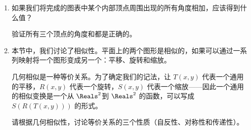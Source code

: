 \begin{enumerate}
    \item 
    如果我们将完成的图表中某个内部顶点周围出现的所有角度相加，应该得到什么值？
    
    验证所有三个顶点的角度和都是正确的。
    
    \begin{center}
    
    \end{center}
    
    \wbvfill
    
    \workbookpagebreak
    
    \item 
    本节中，我们讨论了相似性。平面上的两个图形是相似的，如果可以通过一系列映射将一个图形变成另一个：平移、旋转和缩放。

    几何相似是一种等价关系。为了确定我们的记法，让 $T(x,y)$ 代表一个通用的平移，$R(x,y)$ 代表一个旋转，$S(x,y)$ 代表一个缩放——因此一个通用的相似变换是一个从 $\Reals^2$到 $\Reals^2$ 的函数，可以写成 $S(R(T(x,y)))$ 的形式。
    
    请根据几何相似性，讨论等价关系的三个性质（自反性、对称性和传递性）。
    \wbvfill
    
    \end{enumerate}
    
